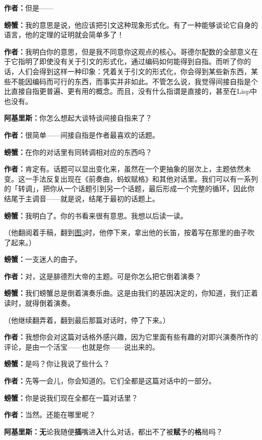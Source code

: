\documentclass[
  12pt,
  twoside,
  openright,
  oldfontcommands,
]{memoir}
\newcommand{\heititext}[1]{{\heifamily\bfseries #1}}
\newcommand{\dialogname}[1]{{\heifamily\bfseries #1}}
\begin{document}
\dialogname{作者：}但是------

\dialogname{螃蟹：}我的意思是说，他应该把引文这种现象形式化。有了一种能够谈论它自身的语言，他的定理的证明就会简单多了！

\dialogname{作者：}我明白你的意思，但是我不同意你这观点的核心。哥德尔配数的全部意义在于它指明了即使没有关于引文的形式化，通过编码如何能得到自指。而听了你的话，人们会得到这样一种印象：凭着关于引文的形式化，你会得到某些新东西，某些不能因编码而可行的东西，而事实并非如此。不管怎么说，我觉得间接自指是个比直接自指更普遍、更有用的概念。而且，没有什么指谓是直接的，甚至在Lisp中也没有。

\dialogname{阿基里斯：}你怎么想起大谈特谈间接自指来了？

\dialogname{作者：}很简单------间接自指是作者最喜欢的话题。

\dialogname{螃蟹：}在你的对话里有同转调相对应的东西吗？

\dialogname{作者：}肯定有。话题可以显出变化来，虽然在一个更抽象的层次上，主题依然未变。这一手法反复出现在《前奏曲，蚂蚁赋格》和其他对话里。我们可以有一系列的「转调」，把你从一个话题引到另一个话题，最后形成一个完整的循环，因此你结尾于主调音------就是说，结尾于最初的话题上。

\dialogname{螃蟹：}我明白了。你的书看来很有意思。我想以后读一读。

（他翻阅着手稿，翻到\hyperref[fig:3]{图3}时，他停下来，拿出他的长笛，按着写在那里的曲子吹了起来。）

\dialogname{螃蟹：}一支迷人的曲子。

\dialogname{作者：}对，这是腓德烈大帝的主题。可是你怎么把它倒着演奏？

\dialogname{螃蟹：}我们螃蟹总是倒着演奏乐曲。这是由我们的基因决定的，你知道，我们正着读时，就得倒着演奏。

（他继续翻弄着，翻到最后那篇对话时，停了下来。）

\dialogname{作者：}我想你会对这篇对话格外感兴趣，因为它里面有些有趣的对即兴演奏所作的评论，是由一个活宝------也就是你------说出来的。

\dialogname{螃蟹：}是吗？你让我说了些什么？

\dialogname{作者：}先等一会儿，你会知道的。它们全都是这篇对话中的一部分。

\dialogname{螃蟹：}你是说我们现在全都在一篇对话里？

\dialogname{作者：}当然。还能在哪里呢？

\dialogname{阿基里斯：}\heititext{无}论我随便\heititext{插}嘴进\heititext{入}什么对话，都出不了被\heititext{赋}予的\heititext{格}局吗？
\end{document}
